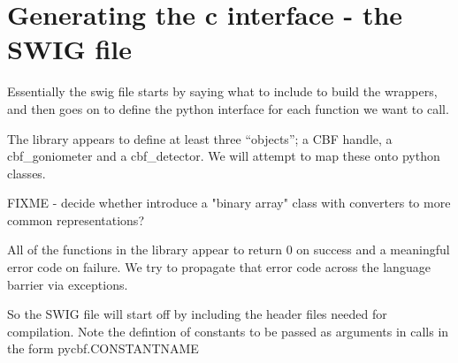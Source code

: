 \documentclass[10pt,a4paper,twoside,notitlepage]{article}
\begin{document}
%
\section{Generating the c interface - the SWIG file}

Essentially the swig file starts by saying what to include to build the wrappers,
and then goes on to define the python interface for each function we want to call.

The library appears to define at least three ``objects''; a CBF handle, a cbf\_goniometer and
a cbf\_detector. We will attempt to map these onto python classes. 

FIXME - decide whether introduce a "binary array" class with converters to 
more common representations?

All of the functions in the library appear to return 0 on success and a 
meaningful error code on failure.
We try to propagate that error code across the language barrier via exceptions.

So the SWIG file will start off by including the header files needed
for compilation.  Note the defintion of constants to be passed as
arguments in calls in the form pycbf.CONSTANTNAME
\end{document}
